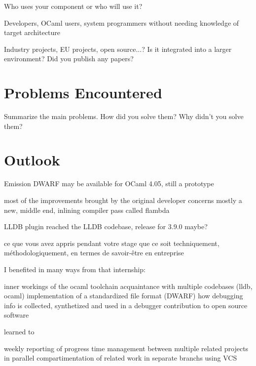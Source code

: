 Who uses your component or who will use it?

Developers, OCaml users, system programmers
without needing knowledge of target architecture

Industry projects, EU projects, open source...? Is it integrated into a larger environment? Did you publish any papers?

\section{Problems Encountered\label{sec:problems}}

Summarize the main problems. How did you solve them? Why didn't you solve them?

\section{Outlook\label{sec:outlook}}
Emission DWARF \autocite{libmond} \autocite{dwpr}
may be available for OCaml 4.05, still a prototype

most of the improvements brought by the original developer concerns mostly a
new, middle end, inlining compiler pass called flambda


LLDB plugin reached the LLDB codebase,
release for 3.9.0 maybe?




ce que vous avez appris pendant votre stage que ce soit techniquement, méthodologiquement,
en termes de savoir-être en entreprise

I benefited in many ways from that internship:

inner workings of the ocaml toolchain
acquaintance with multiple codebases (lldb, ocaml)
implementation of a standardized file format (DWARF)
how debugging info is collected, synthetized and used in a debugger
contribution to open source software

learned to

weekly reporting of progress
time management between multiple related projects in parallel
compartimentation of related work in separate branchs using VCS
